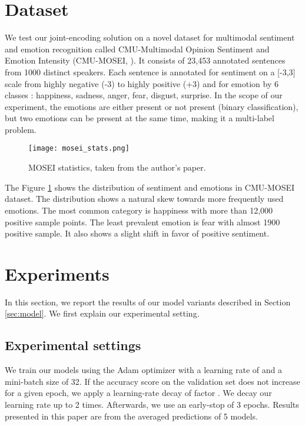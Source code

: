 \documentclass[11pt,a4paper]{article}
\begin{document}
	
	
	
	
	
\section{Dataset}
\label{sec:dataset}
We test our joint-encoding solution on a novel dataset for multimodal sentiment and emotion recognition called CMU-Multimodal Opinion Sentiment and Emotion Intensity (CMU-MOSEI, \citet{bagher-zadeh-etal-2018-multimodal}). It consists of 23,453 annotated sentences from 1000 distinct speakers. Each sentence is annotated for sentiment on a [-3,3] scale from highly negative (-3) to highly positive (+3) and for emotion by 6 classes : happiness, sadness, anger,
fear, disgust, surprise. In the scope of our experiment, the emotions are either present or not present (binary classification), but two emotions can be present at the same time, making it a multi-label problem. \\

\begin{figure}[!ht] 
\centering
\texttt{[image: mosei\_stats.png]}
\caption{MOSEI statistics, taken from the author's paper.}
\label{fig:moseistat}
\end{figure}

The Figure \ref{fig:moseistat} shows the distribution of sentiment and emotions in CMU-MOSEI dataset. The distribution shows a natural skew towards more frequently used emotions. The most common category is happiness with more than 12,000 positive sample points. The least prevalent emotion is fear with almost 1900 positive sample. It also shows a slight shift in favor of positive sentiment. 

\section{Experiments}
\label{sec:results}

In this section, we report the results of our model variants described in Section \ref{sec:model}. We first explain our experimental setting.

\subsection{Experimental settings}
We train our models using the Adam optimizer \cite{kingma2014adam} with a learning rate of  and a mini-batch size of 32. If the accuracy score on the validation set does not increase for a given epoch, we apply a learning-rate decay of factor . We decay our learning rate up to 2 times. Afterwards, we use an early-stop of 3 epochs. Results presented in this paper are from the averaged predictions of 5 models. \\
\end{document}
